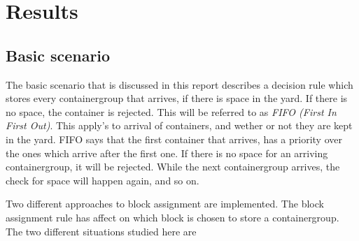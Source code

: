 \documentclass[]{article}
\begin{document}
\section{Results}

\subsection{Basic scenario}
The basic scenario that is discussed in this report describes a decision rule
which stores every containergroup that arrives, if there is space in the yard.
If there is no space, the container is rejected. This will be referred to as
\textit{FIFO (First In First Out)}. This apply's to arrival of containers, and
wether or not they are kept in the yard. FIFO says that the first container
that arrives, has a priority over the ones which arrive after the first one. If
there is no space for an arriving containergroup, it will be rejected. While
the next containergroup arrives, the check for space will happen again, and so
on. 

Two different approaches to block assignment are implemented. The block
assignment rule has affect on which block is chosen to store a containergroup.
The two different situations studied here are 
\end{document}
